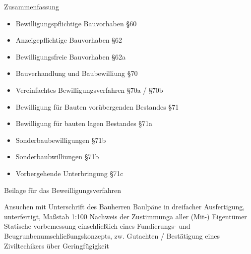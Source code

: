 Zusammenfassung
\begin{tcolorbox}[colback=lightgray!5!lightgray,colframe=lightgray!75!black,title=\textbf{Bewilligung}]
	\begin{itemize}
		\item Bewilligungspflichtige Bauvorhaben §60
		\item Anzeigepflichtige Bauvorhaben §62
		\item Bewilligungsfreie Bauvorhaben §62a
	\end{itemize}
\end{tcolorbox}

\begin{tcolorbox}[colback=lightgray!5!lightgray,colframe=lightgray!75!black,title=\textbf{Bewilligungsverfahren}]
	\begin{itemize}
		\item Bauverhandlung und Baubewilliung §70
		\item Vereinfachtes Bewilligungsverfahren §70a / §70b
		\item Bewilligung für Bauten vorübergenden Bestandes §71
		\item Bewilligung für bauten lagen Bestandes §71a
		\item Sonderbaubewilligungen §71b
		\item Sonderbaubwilliungen §71b
		\item Vorbergehende Unterbringung §71c
	\end{itemize}	
\end{tcolorbox}


Beilage für das Beweilligungsverfahren
\begin{tcolorbox}[colback=lightgray!5!lightgray,colframe=lightgray!75!black,title=\textbf{Immer erforderlich}] 
Ansuchen mit Unterschrift des Bauherren \newline
Baulpäne in dreifacher Ausfertigung, unterfertigt, Maßstab 1:100 \newline
Nachweis der Zustimmunga aller (Mit-) Eigentümer\newline
Statische vorbemessung einschließlich eines Fundierungs- und Beugrunbenumschließungskonzepts, zw. Gutachten / Bestätigung eines Ziviltechikers über Geringfügigkeit
\end{tcolorbox}


